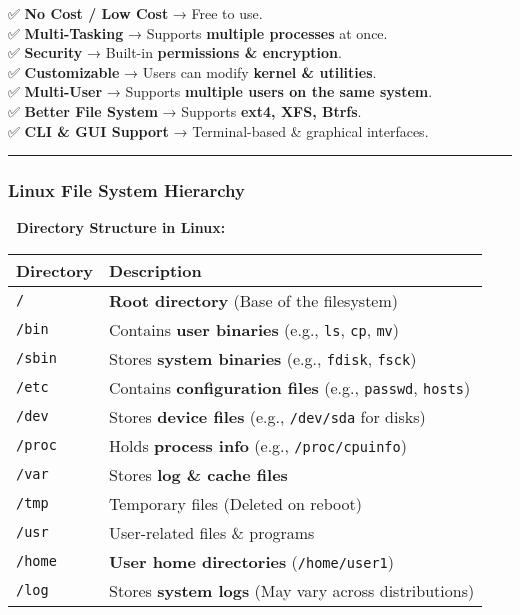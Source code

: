 \documentclass[
]{article}
\begin{document}
✅ \textbf{No Cost / Low Cost} → Free to use.\\
✅ \textbf{Multi-Tasking} → Supports \textbf{multiple processes} at
once.\\
✅ \textbf{Security} → Built-in \textbf{permissions \& encryption}.\\
✅ \textbf{Customizable} → Users can modify \textbf{kernel \&
utilities}.\\
✅ \textbf{Multi-User} → Supports \textbf{multiple users on the same
system}.\\
✅ \textbf{Better File System} → Supports \textbf{ext4, XFS, Btrfs}.\\
✅ \textbf{CLI \& GUI Support} → Terminal-based \& graphical interfaces.

\begin{center}\rule{0.5\linewidth}{0.5pt}\end{center}

\subsubsection{\texorpdfstring{\textbf{Linux File System
Hierarchy}}{Linux File System Hierarchy}}\label{linux-file-system-hierarchy}

📌 \textbf{Directory Structure in Linux:}

\begin{longtable}[]{@{}ll@{}}
\toprule\noalign{}
\textbf{Directory} & \textbf{Description} \\
\midrule\noalign{}
\endhead
\bottomrule\noalign{}
\endlastfoot
\texttt{/} & \textbf{Root directory} (Base of the filesystem) \\
\texttt{/bin} & Contains \textbf{user binaries} (e.g., \texttt{ls},
\texttt{cp}, \texttt{mv}) \\
\texttt{/sbin} & Stores \textbf{system binaries} (e.g., \texttt{fdisk},
\texttt{fsck}) \\
\texttt{/etc} & Contains \textbf{configuration files} (e.g.,
\texttt{passwd}, \texttt{hosts}) \\
\texttt{/dev} & Stores \textbf{device files} (e.g., \texttt{/dev/sda}
for disks) \\
\texttt{/proc} & Holds \textbf{process info} (e.g.,
\texttt{/proc/cpuinfo}) \\
\texttt{/var} & Stores \textbf{log \& cache files} \\
\texttt{/tmp} & Temporary files (Deleted on reboot) \\
\texttt{/usr} & User-related files \& programs \\
\texttt{/home} & \textbf{User home directories}
(\texttt{/home/user1}) \\
\texttt{/log} & Stores \textbf{system logs} (May vary across
distributions) \\
\end{longtable}
\end{document}
